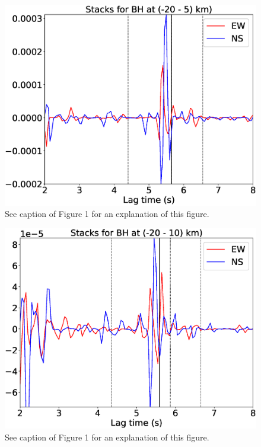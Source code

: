 \documentclass[letterpaper, 12pt]{article}
\begin{document}
\begin{figure}[H]
\includegraphics[width=\linewidth]{figures/intervals/BH_-20_005_stacks.eps}
\caption{See caption of Figure 1 for an explanation of this figure.}
\end{figure}

\begin{figure}[H]
\includegraphics[width=\linewidth]{figures/intervals/BH_-20_010_stacks.eps}
\caption{See caption of Figure 1 for an explanation of this figure.}
\end{figure}
\end{document}
